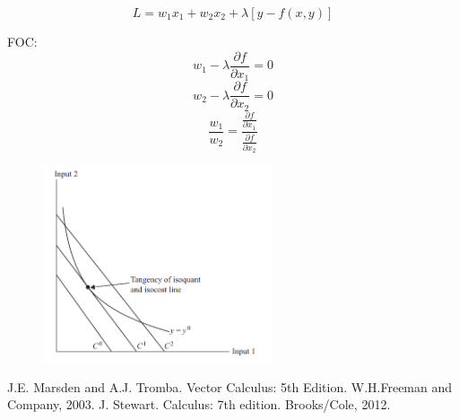 \documentclass[]{article}
\begin{document}
$$L=w_1x_1+w_2x_2+\lambda[y-f(x,y)]$$

FOC:
$$
w_1-\lambda \frac{\partial f}{\partial x_1}=0 
$$
$$
w_2-\lambda \frac{\partial f}{\partial x_2}=0 
$$
$$
\frac{w_1}{w_2}= \frac{\frac{\partial f}{\partial x_1}}{\frac{\partial f}{\partial x_2}}
$$
\begin{figure}[h]
    \centering
    \includegraphics[width=0.60\textwidth]{cost_minimization.png}
\end{figure}



\begin{thebibliography}{9}
{\sc J.E. Marsden and A.J. Tromba.} Vector Calculus: 5th Edition. W.H.Freeman and Company, 2003.
{\sc J. Stewart.} Calculus: 7th edition. Brooks/Cole, 2012.
\end{thebibliography}
\end{document}
